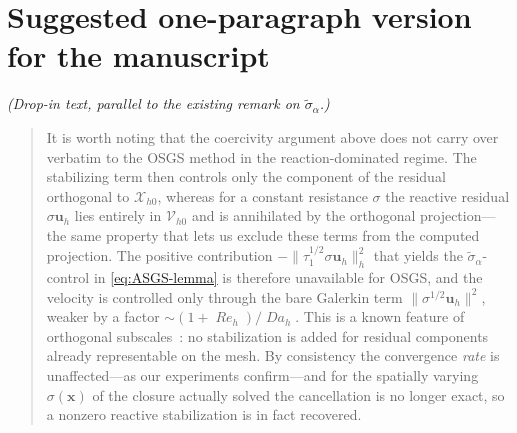 \documentclass[11pt]{article}
\newcommand{\Reyn}{\operatorname{\mathit{Re}}}
\newcommand{\Damk}{\operatorname{\mathit{Da}}}
\theoremstyle{plain}
\theoremstyle{remark}
\newcommand{\uh}{\boldsymbol{u}_h}
\newcommand{\Xh}{\mathcal{X}_{h0}}
\newcommand{\siga}{\widetilde{\sigma}_\alpha}
\begin{document}
\section*{Suggested one-paragraph version for the manuscript}
\noindent\textit{(Drop-in text, parallel to the existing remark on $\siga$.)}
\begin{quote}\small
It is worth noting that the coercivity argument above does not carry over verbatim
to the OSGS method in the reaction-dominated regime. The stabilizing term then
controls only the component of the residual orthogonal to $\Xh$, whereas for a
constant resistance $\sigma$ the reactive residual $\sigma\uh$ lies entirely in
$\mathcal{V}_{h0}$ and is annihilated by the orthogonal projection---the same
property that lets us exclude these terms from the computed projection. The
positive contribution $-\|\tau_1^{1/2}\sigma\uh\|_h^2$ that yields the
$\siga$-control in \cref{eq:ASGS-lemma} is therefore unavailable for OSGS, and the
velocity is controlled only through the bare Galerkin term $\|\sigma^{1/2}\uh\|^2$,
weaker by a factor $\sim(1+\Reyn_h)/\Damk_h$. This is a known feature of orthogonal
subscales~\cite{gravenkamp2023dispersed,codina2002stabilized}: no stabilization is
added for residual components already representable on the mesh. By consistency the
convergence \emph{rate} is unaffected---as our experiments confirm---and for the
spatially varying $\sigma(\boldsymbol{x})$ of the closure actually solved the
cancellation is no longer exact, so a nonzero reactive stabilization is in fact
recovered.
\end{quote}
\end{document}
